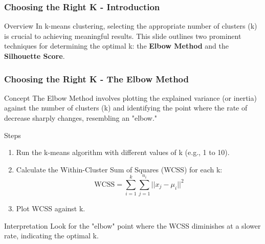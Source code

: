 \documentclass[aspectratio=169]{beamer}
\begin{document}
\begin{frame}[fragile]
    \frametitle{Choosing the Right K - Introduction}
    \begin{block}{Overview}
        In k-means clustering, selecting the appropriate number of clusters (k) is crucial to achieving meaningful results. This slide outlines two prominent techniques for determining the optimal k: the \textbf{Elbow Method} and the \textbf{Silhouette Score}.
    \end{block}
\end{frame}

\begin{frame}[fragile]
    \frametitle{Choosing the Right K - The Elbow Method}
    \begin{block}{Concept}
        The Elbow Method involves plotting the explained variance (or inertia) against the number of clusters (k) and identifying the point where the rate of decrease sharply changes, resembling an "elbow."
    \end{block}
    
    \begin{block}{Steps}
        \begin{enumerate}
            \item Run the k-means algorithm with different values of k (e.g., 1 to 10).
            \item Calculate the Within-Cluster Sum of Squares (WCSS) for each k:
            \begin{equation}
                \text{WCSS} = \sum_{i=1}^{k} \sum_{j=1}^{n_i} ||x_j - \mu_i||^2
            \end{equation}
            \item Plot WCSS against k.
        \end{enumerate}
    \end{block}
    
    \begin{block}{Interpretation}
        Look for the "elbow" point where the WCSS diminishes at a slower rate, indicating the optimal k.
    \end{block}
\end{frame}
\end{document}
